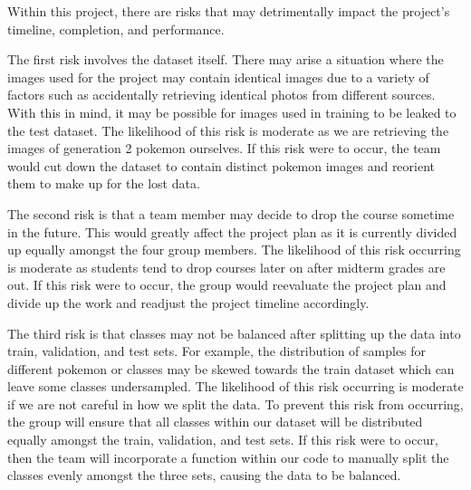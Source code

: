 \documentclass{article} %
\begin{document}
Within this project, there are risks that may detrimentally impact the project’s timeline, 
completion, and performance. 

The first risk involves the dataset itself. There may arise a situation where the images used for the project may contain identical images due to a variety of factors such as accidentally retrieving identical photos from different sources. With this in mind, it may be possible for images used in training to be leaked to the test dataset. The likelihood of this risk is moderate as we are retrieving the images of generation 2 pokemon ourselves. If this risk were to occur, the team would cut down the dataset to contain distinct pokemon images and reorient them to make up for the lost data.

The second risk is that a team member may decide to drop the course sometime in the future. This would greatly affect the project plan as it is currently divided up equally amongst the four group members. The likelihood of this risk occurring is moderate as students tend to drop courses later on after midterm grades are out. If this risk were to occur, the group would reevaluate the project plan and divide up the work and readjust the project timeline accordingly. 

The third risk is that classes may not be balanced after splitting up the data into train, validation, and test sets. For example, the distribution of samples for different pokemon or classes may be skewed towards the train dataset which can leave some classes undersampled. The likelihood of this risk occurring is moderate if we are not careful in how we split the data. To prevent this risk from occurring, the group will ensure that all classes within our dataset will be distributed equally amongst the train, validation, and test sets. If this risk were to occur, then the team will incorporate a function within our code to manually split the classes evenly amongst the three sets, causing the data to be balanced. 


\label{last_page}



\end{document}
